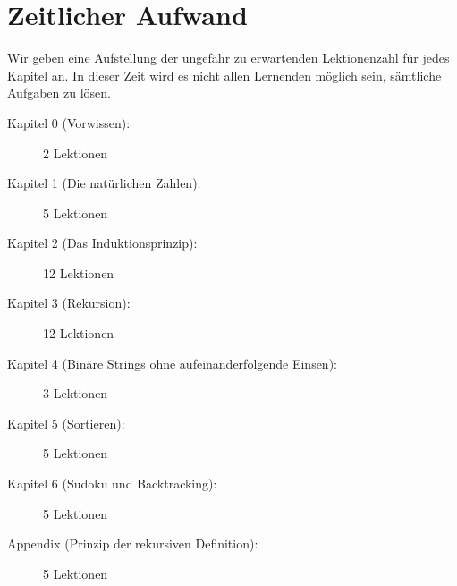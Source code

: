 \section*{Zeitlicher Aufwand}
Wir geben eine Aufstellung der ungefähr zu erwartenden Lektionenzahl für jedes Kapitel an. In dieser Zeit wird es nicht allen Lernenden möglich sein, sämtliche Aufgaben zu lösen.
\begin{description}
	\item[Kapitel 0 (Vorwissen):] 2 Lektionen
	\item[Kapitel 1 (Die natürlichen Zahlen):] 5 Lektionen
	\item[Kapitel 2 (Das Induktionsprinzip):] 12 Lektionen
	\item[Kapitel 3 (Rekursion):] 12 Lektionen
	\item[Kapitel 4 (Binäre Strings ohne aufeinanderfolgende Einsen):] 3 Lektionen
	\item[Kapitel 5 (Sortieren):] 5 Lektionen
	\item[Kapitel 6 (Sudoku und Backtracking):] 5 Lektionen
	\item[Appendix (Prinzip der rekursiven Definition):] 5 Lektionen
\end{description}